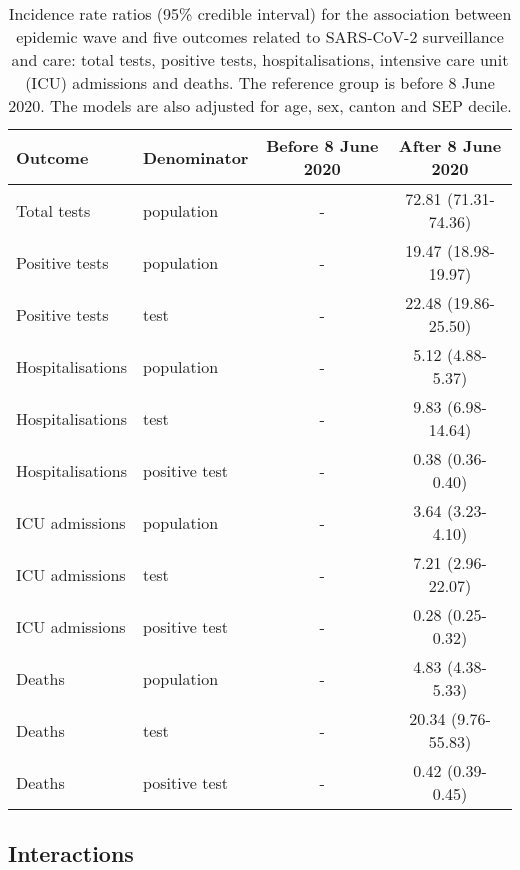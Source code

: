 \documentclass{article}
\begin{document}
	\begin{table}[H]
		\centering
		\caption{Incidence rate ratios (95\% credible interval) for the association between epidemic wave and five outcomes related to SARS-CoV-2 surveillance and care: total tests, positive tests, hospitalisations, intensive care unit (ICU) admissions and deaths. The reference group is before 8 June 2020. The models are also adjusted for age, sex, canton and SEP decile.}
		\label{tab:cov-wave}
		\medskip
		\begin{tabular}{llcc}
			\hline
			Outcome & Denominator & Before 8 June 2020 & After 8 June 2020 \\ 
			\hline
			Total tests & population & - & 72.81 (71.31-74.36) \\ 
			Positive tests & population & - & 19.47 (18.98-19.97) \\ 
			Positive tests & test & - & 22.48 (19.86-25.50) \\ 
			Hospitalisations & population & - & 5.12 (4.88-5.37) \\ 
			Hospitalisations & test & - & 9.83 (6.98-14.64) \\ 
			Hospitalisations & positive test & - & 0.38 (0.36-0.40) \\ 
			ICU admissions & population & - & 3.64 (3.23-4.10) \\ 
			ICU admissions & test & - & 7.21 (2.96-22.07) \\ 
			ICU admissions & positive test & - & 0.28 (0.25-0.32) \\ 
			Deaths & population & - & 4.83 (4.38-5.33) \\ 
			Deaths & test & - & 20.34 (9.76-55.83) \\ 
			Deaths & positive test & - & 0.42 (0.39-0.45) \\ 
			\hline
		\end{tabular}
	\end{table}
	
	
	
	\subsection{Interactions}
	
\end{document}

